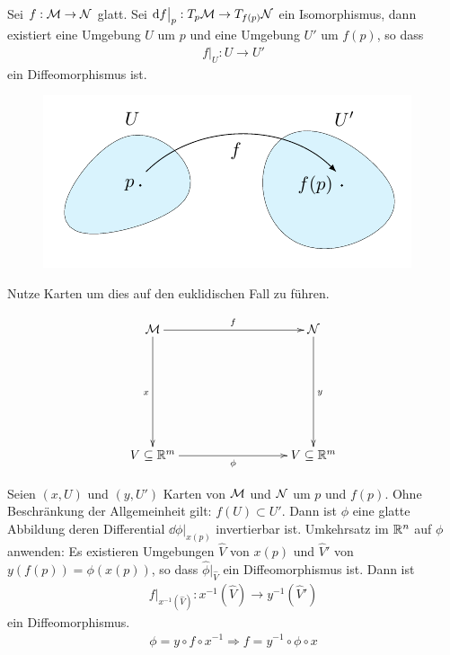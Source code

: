 \begin{satz}[Umkehrsatz]
\label{satz:Umkehrsatz}
Sei $f: \mathcal{M} \to \mathcal{N}$ glatt. 
Sei $\dd f \big\vert_p : T_{p} \mathcal{M} \to T_{f(p)}\mathcal{N}$ ein Isomorphismus,
dann existiert eine Umgebung $U$ um $p$ und eine Umgebung $U'$ um $f(p)$, so dass
\begin{align}
f\big\vert_U : U \to U'
\end{align}
ein Diffeomorphismus ist.
\begin{figure}[H]
\centering
\includegraphics[width=0.5\linewidth]{figures/tikz/inverse_function_theorem.pdf}
\label{img:umkehrsatz}
\end{figure} 
\end{satz}

\begin{bew} \leavevmode
Nutze Karten um dies auf den euklidischen Fall zu führen.

\begin{align}
\begin{xy}
  \xymatrix@=0.25\linewidth{
      \mfk \ar[r]^f \ar[d]_x    &   \mfka \ar[d]^y \\
      V\subseteq \R^m \ar[r]_\phi             &   V\subseteq \R^m    
  }
\end{xy}
\end{align}

Seien $(x, U)$ und $(y, U')$ Karten von $\mathcal{M}$ und $\mathcal{N}$ um $p$ und $f(p)$.
Ohne Beschränkung der Allgemeinheit gilt: $f(U) \subset U'$.
Dann ist $\phi$ eine glatte Abbildung deren Differential $\dd \phi \big\vert_{x(p)}$ invertierbar ist.
Umkehrsatz im $\mathbb{R}^n$ auf $\phi$ anwenden:
Es existieren Umgebungen $\hat{V}$ von $x(p)$ und $\hat{V}'$ von $y(f(p)) = \phi(x(p))$, so dass
$\hat{\phi}\big\vert_{\hat{V}}$ ein Diffeomorphismus ist.
Dann ist
\begin{align}
f\big\vert_{x^{-1}(\hat{V})}: x^{-1}(\hat{V}) \to y^{-1}(\hat{V}')
\end{align}
ein Diffeomorphismus.
\begin{align}
\phi = y \circ f \circ x^{-1} \Rightarrow f = y^{-1} \circ \phi \circ x
\end{align}
\end{bew}



